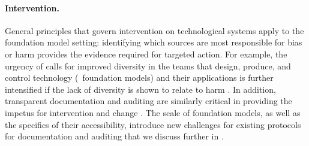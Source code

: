 \paragraph{Intervention.}
General principles that govern intervention on technological systems apply to the foundation model setting: identifying which sources are most responsible for bias or harm provides the evidence required for targeted action.
For example, the urgency of calls for improved diversity in the teams that design, produce, and control technology (\eg~foundation models) and their applications \citep{Longino1990, Harding2015, Nielsen2017, oconnor2019, Hofstra2020, Katell2020} is further intensified if the lack of diversity is shown to relate to harm \citep{caswell2021}. 
In addition, transparent documentation \citep[\eg][]{gebru2018datasheets, bender2018data, Mitchell_2019} and auditing \citep[\eg][]{raji2019} are similarly critical in providing the impetus for intervention and change \citep{Burrell2016, Lipton2018, Creel2020, Raji2020, Wilson2021}.
The scale of foundation models, as well as the specifics of their accessibility, introduce new challenges for existing protocols for documentation and auditing that we discuss further in .

